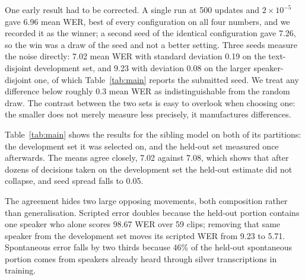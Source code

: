 One early result had to be corrected. A single run at 500 updates and
$2\times10^{-5}$ gave 6.96 mean WER, best of every configuration on all four
numbers, and we recorded it as the winner; a second seed of the identical
configuration gave 7.26, so the win was a draw of the seed and not a better
setting. Three seeds measure the noise directly:
7.02 mean WER with standard deviation 0.19 on the text-disjoint development
set, and 9.23 with deviation 0.08 on the larger speaker-disjoint one, of which
Table~\ref{tab:main} reports the submitted seed. We treat any difference below
roughly 0.3 mean WER as indistinguishable from the random draw. The contrast between the two sets is easy to overlook when choosing one:
the smaller does not merely measure less precisely, it manufactures differences.

Table~\ref{tab:main} shows the results for the sibling model on both of its
partitions: the development set it was selected on, and the held-out set
measured once afterwards. The means agree closely, 7.02 against 7.08, which
shows that after dozens of decisions taken on the development set the held-out
estimate did not collapse, and seed spread falls to 0.05.

The agreement hides two large opposing movements, both composition rather than
generalisation. Scripted error doubles because the held-out portion contains
one speaker who alone scores 98.67 WER over 59 clips; removing that same
speaker from the development set moves its scripted WER from 9.23 to 5.71.
Spontaneous error falls by two thirds because 46\% of the held-out spontaneous
portion comes from speakers already heard through silver transcriptions in
training.

